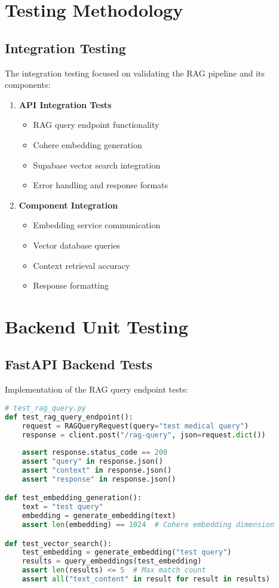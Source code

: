 \section{Testing Methodology}
\subsection{Integration Testing}
The integration testing focused on validating the RAG pipeline and its components:

\begin{enumerate}
    \item \textbf{API Integration Tests}
    \begin{itemize}
        \item RAG query endpoint functionality
        \item Cohere embedding generation
        \item Supabase vector search integration
        \item Error handling and response formats
    \end{itemize}

    \item \textbf{Component Integration}
    \begin{itemize}
        \item Embedding service communication
        \item Vector database queries
        \item Context retrieval accuracy
        \item Response formatting
    \end{itemize}
\end{enumerate}

\section{Backend Unit Testing}
\subsection{FastAPI Backend Tests}
Implementation of the RAG query endpoint tests:

\begin{lstlisting}[language=Python, caption=RAG Query Endpoint Tests]
# test_rag_query.py
def test_rag_query_endpoint():
    request = RAGQueryRequest(query="test medical query")
    response = client.post("/rag-query", json=request.dict())
    
    assert response.status_code == 200
    assert "query" in response.json()
    assert "context" in response.json()
    assert "response" in response.json()

def test_embedding_generation():
    text = "test query"
    embedding = generate_embedding(text)
    assert len(embedding) == 1024  # Cohere embedding dimension

def test_vector_search():
    test_embedding = generate_embedding("test query")
    results = query_embeddings(test_embedding)
    assert len(results) <= 5  # Max match count
    assert all("text_content" in result for result in results)
\end{lstlisting}

